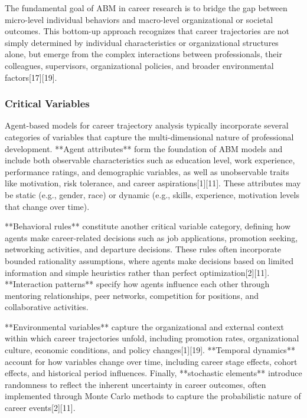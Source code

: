 \documentclass[main.tex]{subfiles}
\begin{document}
The fundamental goal of ABM in career research is to bridge the gap between micro-level individual behaviors and macro-level organizational or societal outcomes. This bottom-up approach recognizes that career trajectories are not simply determined by individual characteristics or organizational structures alone, but emerge from the complex interactions between professionals, their colleagues, supervisors, organizational policies, and broader environmental factors[17][19].

\subsubsection{Critical Variables}

Agent-based models for career trajectory analysis typically incorporate several categories of variables that capture the multi-dimensional nature of professional development. **Agent attributes** form the foundation of ABM models and include both observable characteristics such as education level, work experience, performance ratings, and demographic variables, as well as unobservable traits like motivation, risk tolerance, and career aspirations[1][11]. These attributes may be static (e.g., gender, race) or dynamic (e.g., skills, experience, motivation levels that change over time).

**Behavioral rules** constitute another critical variable category, defining how agents make career-related decisions such as job applications, promotion seeking, networking activities, and departure decisions. These rules often incorporate bounded rationality assumptions, where agents make decisions based on limited information and simple heuristics rather than perfect optimization[2][11]. **Interaction patterns** specify how agents influence each other through mentoring relationships, peer networks, competition for positions, and collaborative activities.

**Environmental variables** capture the organizational and external context within which career trajectories unfold, including promotion rates, organizational culture, economic conditions, and policy changes[1][19]. **Temporal dynamics** account for how variables change over time, including career stage effects, cohort effects, and historical period influences. Finally, **stochastic elements** introduce randomness to reflect the inherent uncertainty in career outcomes, often implemented through Monte Carlo methods to capture the probabilistic nature of career events[2][11].
\end{document}
